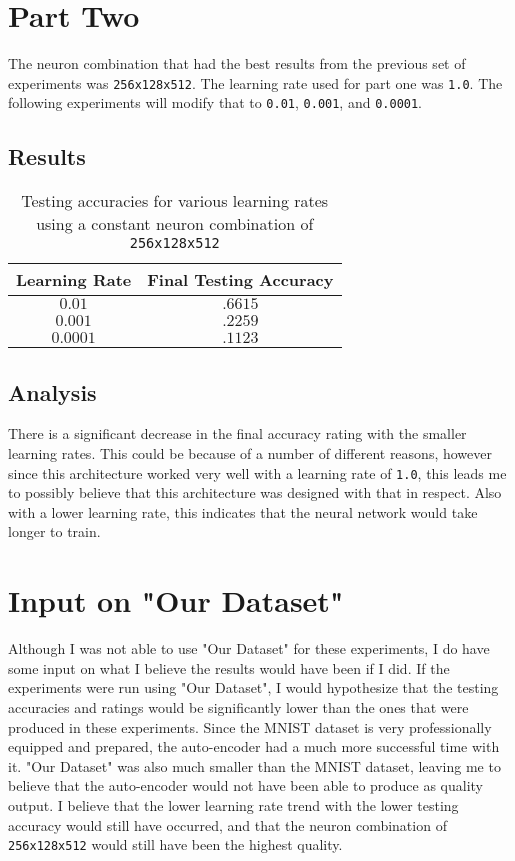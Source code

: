 \documentclass[a4paper]{article}
\begin{document}
\newpage
\section{Part Two}
The neuron combination that had the best results from the previous set of experiments was \texttt{256x128x512}. The learning rate used for part one was \texttt{1.0}. The following experiments will modify that to \texttt{0.01}, \texttt{0.001}, and \texttt{0.0001}.

\subsection{Results}
\begin{table}[h]
 \caption{Testing accuracies for various learning rates using a constant neuron combination of \texttt{256x128x512}}
 \label{table}
 \begin{center}
  \begin{tabular}{c|c}
    \hline \hline
    Learning Rate & Final Testing Accuracy \\
    \hline
     $ 0.01   $ & $ .6615 $ \\
     $ 0.001  $ & $ .2259 $ \\
     $ 0.0001 $ & $ .1123 $
  \end{tabular}
 \end{center}
\end{table}

\subsection{Analysis}
There is a significant decrease in the final accuracy rating with the smaller learning rates. This could be because of a number of different reasons, however since this architecture worked very well with a learning rate of \texttt{1.0}, this leads me to possibly believe that this architecture was designed with that in respect. Also with a lower learning rate, this indicates that the neural network would take longer to train.

\section{Input on "Our Dataset"}
Although I was not able to use "Our Dataset" for these experiments, I do have some input on what I believe the results would have been if I did. If the experiments were run using "Our Dataset", I would hypothesize that the testing accuracies and ratings would be significantly lower than the ones that were produced in these experiments. Since the MNIST dataset is very professionally equipped and prepared, the auto-encoder had a much more successful time with it. "Our Dataset" was also much smaller than the MNIST dataset, leaving me to believe that the auto-encoder would not have been able to produce as quality output. I believe that the lower learning rate trend with the lower testing accuracy would still have occurred, and that the neuron combination of \texttt{256x128x512} would still have been the highest quality.
\end{document}
